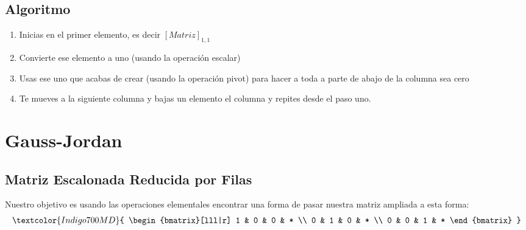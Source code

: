 \documentclass[12pt, fleqn]{report}                             %
\theoremstyle{break}                                            %
\begin{document}
            \subsection{Algoritmo}

                \begin{enumerate}
                    \item 
                        Inicias en el primer elemento, es decir $[Matriz]_{1, 1}$
                    \item 
                        Convierte ese elemento a uno (usando la operación escalar)
                    \item
                        Usas ese uno que acabas de crear (usando la operación pivot)
                        para hacer a toda a parte de abajo de la columna sea cero
                    \item
                        Te mueves a la siguiente columna y bajas un elemento el columna
                        y repites desde el paso uno.
                \end{enumerate}




        \clearpage
        \section{Gauss-Jordan}


            \subsection{Matriz Escalonada Reducida por Filas}

                Nuestro objetivo es usando las operaciones elementales encontrar una
                forma de pasar nuestra matriz ampliada a esta forma:
                \begin{align*}
                    \textcolor{Indigo700MD}{
                        \begin{bmatrix}[lll|r]
                            1 & 0 & 0 & * \\
                            0 & 1 & 0 & * \\
                            0 & 0 & 1 & * 
                        \end{bmatrix}
                    }
                \end{align*}
\end{document}
